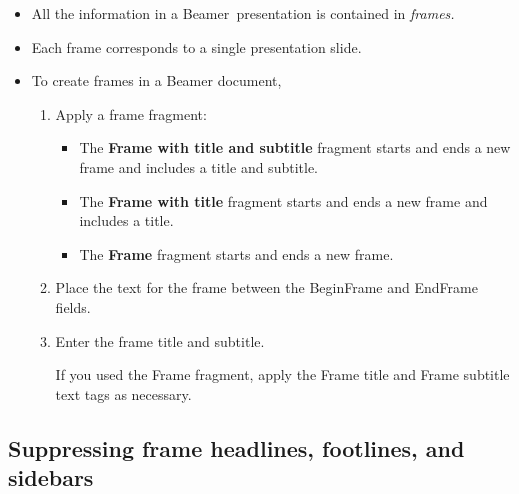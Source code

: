 \documentclass[notes=show,beamer]{beamer}
\newenvironment{stepenumerate}{\begin{enumerate}[<+->]}{\end{enumerate}}
\newenvironment{stepitemize}{\begin{itemize}[<+->]}{\end{itemize} }
\begin{document}
\begin{frame}%


\begin{stepitemize}
\item All the information in a Beamer\emph{\ }presentation is contained in 
\textit{frames.}

\item Each frame corresponds to a single presentation slide.

\item To create frames in a Beamer document,

\begin{stepenumerate}
\item Apply a frame fragment:

\begin{stepitemize}
\item The \textbf{Frame with title and subtitle} fragment starts and ends a
new frame and includes a title and subtitle.

\item The \textbf{Frame with title }fragment starts and ends a new frame and
includes a title.

\item The \textbf{Frame} fragment starts and ends a new frame.
\end{stepitemize}

\item Place the text for the frame between the BeginFrame and EndFrame
fields.

\item Enter the frame title and subtitle.

If you used the Frame fragment, apply the Frame title and Frame subtitle
text tags as necessary.
\end{stepenumerate}
\end{stepitemize}

\transboxout%
\end{frame}%

\subsection{Suppressing frame headlines, footlines, and sidebars}
\end{document}
